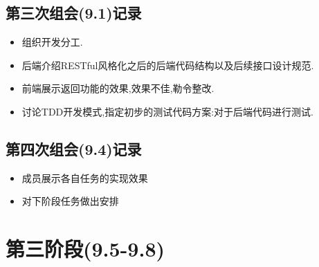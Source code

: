 \subsection{第三次组会(9.1)记录}
\begin{itemize}
    \item 组织开发分工.
    \item 后端介绍RESTful风格化之后的后端代码结构以及后续接口设计规范.
    \item 前端展示返回功能的效果,效果不佳,勒令整改.
    \item 讨论TDD开发模式,指定初步的测试代码方案:对于后端代码进行测试.
\end{itemize}
\subsection{第四次组会(9.4)记录}
\begin{itemize}
    \item 成员展示各自任务的实现效果
    \item 对下阶段任务做出安排
\end{itemize}


\section{第三阶段(9.5-9.8)}

